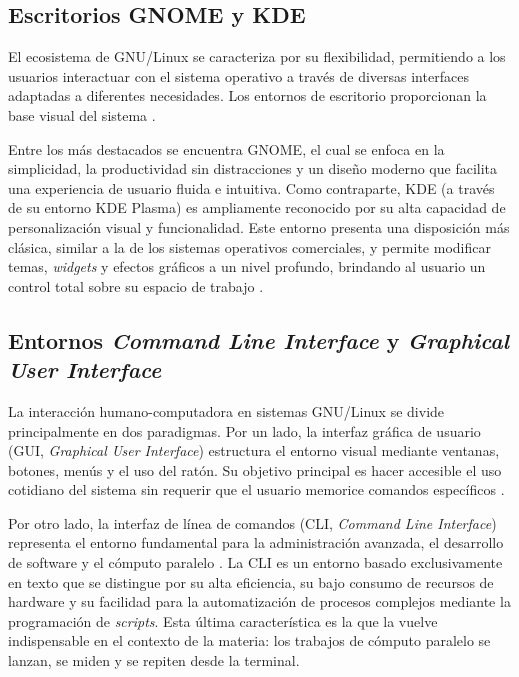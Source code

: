 
\subsection{Escritorios GNOME y KDE}
El ecosistema de GNU/Linux se caracteriza por su flexibilidad, permitiendo a los usuarios interactuar con el sistema operativo a través de diversas interfaces adaptadas a diferentes necesidades. Los entornos de escritorio proporcionan la base visual del sistema \cite{garrels:intro-linux:2008}.

Entre los más destacados se encuentra GNOME, el cual se enfoca en la simplicidad, la productividad sin distracciones y un diseño moderno que facilita una experiencia de usuario fluida e intuitiva. Como contraparte, KDE (a través de su entorno KDE Plasma) es ampliamente reconocido por su alta capacidad de personalización visual y funcionalidad. Este entorno presenta una disposición más clásica, similar a la de los sistemas operativos comerciales, y permite modificar temas, \textit{widgets} y efectos gráficos a un nivel profundo, brindando al usuario un control total sobre su espacio de trabajo \cite{negus:linux-bible:2020}.

\subsection{Entornos \textit{Command Line Interface} y \textit{Graphical User Interface}}
La interacción humano-computadora en sistemas GNU/Linux se divide principalmente en dos paradigmas. Por un lado, la interfaz gráfica de usuario (GUI, \textit{Graphical User Interface}) estructura el entorno visual mediante ventanas, botones, menús y el uso del ratón. Su objetivo principal es hacer accesible el uso cotidiano del sistema sin requerir que el usuario memorice comandos específicos \cite{garrels:intro-linux:2008}.

Por otro lado, la interfaz de línea de comandos (CLI, \textit{Command Line Interface}) representa el entorno fundamental para la administración avanzada, el desarrollo de software y el cómputo paralelo \cite{shotts:linux-command-line:2019}. La CLI es un entorno basado exclusivamente en texto que se distingue por su alta eficiencia, su bajo consumo de recursos de hardware y su facilidad para la automatización de procesos complejos mediante la programación de \textit{scripts}. Esta última característica es la que la vuelve indispensable en el contexto de la materia: los trabajos de cómputo paralelo se lanzan, se miden y se repiten desde la terminal.

